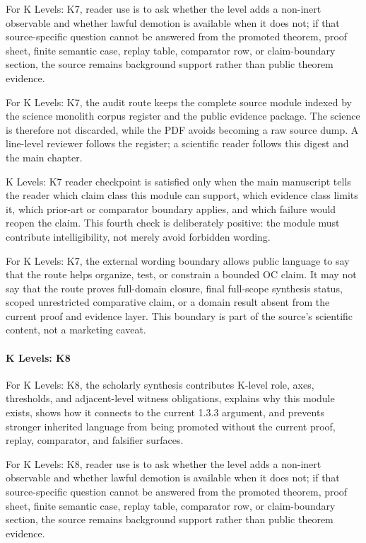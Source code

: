 For K Levels: K7, reader use is to ask whether the level adds a non-inert observable and whether lawful demotion is available when it does not; if that source-specific question cannot be answered from the promoted theorem, proof sheet, finite semantic case, replay table, comparator row, or claim-boundary section, the source remains background support rather than public theorem evidence.


For K Levels: K7, the audit route keeps the complete source module indexed by the science monolith corpus register and the public evidence package. The science is therefore not discarded, while the PDF avoids becoming a raw source dump. A line-level reviewer follows the register; a scientific reader follows this digest and the main chapter.


K Levels: K7 reader checkpoint is satisfied only when the main manuscript tells the reader which claim class this module can support, which evidence class limits it, which prior-art or comparator boundary applies, and which failure would reopen the claim. This fourth check is deliberately positive: the module must contribute intelligibility, not merely avoid forbidden wording.


For K Levels: K7, the external wording boundary allows public language to say that the route helps organize, test, or constrain a bounded OC claim. It may not say that the route proves full-domain closure, final full-scope synthesis status, scoped unrestricted comparative claim, or a domain result absent from the current proof and evidence layer. This boundary is part of the source's scientific content, not a marketing caveat.


\paragraph{K Levels: K8}

For K Levels: K8, the scholarly synthesis contributes K-level role, axes, thresholds, and adjacent-level witness obligations, explains why this module exists, shows how it connects to the current 1.3.3 argument, and prevents stronger inherited language from being promoted without the current proof, replay, comparator, and falsifier surfaces.


For K Levels: K8, reader use is to ask whether the level adds a non-inert observable and whether lawful demotion is available when it does not; if that source-specific question cannot be answered from the promoted theorem, proof sheet, finite semantic case, replay table, comparator row, or claim-boundary section, the source remains background support rather than public theorem evidence.


